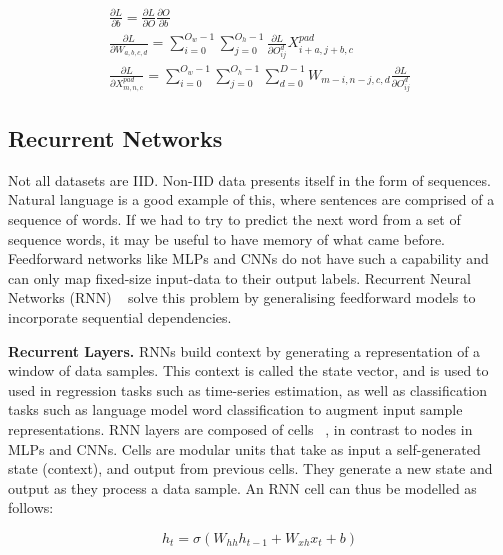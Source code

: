 \begin{subequations}
\begin{gather}
	\frac{\partial L} {\partial b} = \frac{\partial L} {\partial O}\frac{\partial O} {\partial b} \\
	\frac{\partial L} {\partial W_{a,b,c,d}} = \sum_{i=0}^{O_w - 1}\sum_{j=0}^{O_h - 1}\frac{\partial L} {\partial O_{ij}^{d}}X_{i+a,j+b,c}^{pad} \\
	\frac{\partial L} {\partial X_{m,n,c}^{pad}} = \sum_{i=0}^{O_w - 1}\sum_{j=0}^{O_h - 1}\sum_{d=0}^{D - 1}W_{m-i,n-j,c,d}\frac{\partial L} {\partial O_{ij}^{d}}
\end{gather}
\end{subequations}


\subsection{Recurrent Networks}

Not all datasets are IID. Non-IID data presents itself in the form of sequences. Natural language is a good example of this, where sentences are comprised of a sequence of words. If we had to try to predict the next word from a set of sequence words, it may be useful to have memory of what came before. Feedforward networks like MLPs and CNNs do not have such a capability and can only map fixed-size input-data to their output labels. Recurrent Neural Networks (RNN) ~\citep{werbos1988generalization} solve this problem by generalising feedforward models to incorporate sequential dependencies. \bigskip

\textbf{Recurrent Layers.} RNNs build context by generating a representation of a window of data samples. This context is called the state vector, and is used to used in regression tasks such as time-series estimation, as well as classification tasks such as language model word classification to augment input sample representations. RNN layers are composed of cells ~\citep{DLIndaba2018}, in contrast to nodes in MLPs and CNNs. Cells are modular units that take as input a self-generated state (context), and output from previous cells. They generate a new state and output as they process a data sample. An RNN cell can thus be modelled as follows: 

\begin{equation}
	h_t = \sigma(W_{hh}h_{t-1} + W_{xh}x_t + b)
\end{equation}

